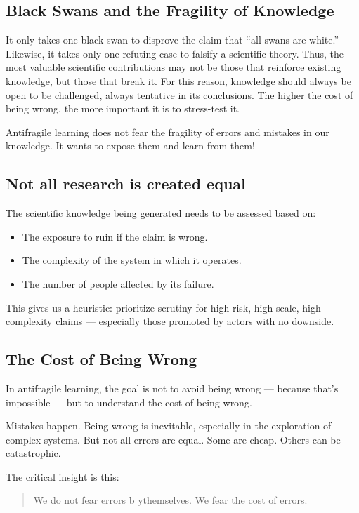 \subsection{Black Swans and the Fragility of Knowledge}

It only takes one black swan to disprove the claim that “all swans are white.” Likewise, it takes only one refuting case to falsify a scientific theory. Thus, the most valuable scientific contributions may not be those that reinforce existing knowledge, but those that break it. For this reason, knowledge should always be open to be challenged, always tentative in its conclusions. The higher the cost of being wrong, the more important it is to stress-test it.

Antifragile learning does not fear the fragility of errors and mistakes in our knowledge. It wants to expose them and learn from them!

\subsection{Not all research is created equal}

The scientific knowledge being generated needs to be assessed based on:
\begin{itemize}
	\item The exposure to ruin if the claim is wrong.
	\item The complexity of the system in which it operates.
	\item The number of people affected by its failure.
\end{itemize}

This gives us a heuristic: prioritize scrutiny for high-risk, high-scale, high-complexity claims — especially those promoted by actors with no downside.

\subsection{The Cost of Being Wrong}

In antifragile learning, the goal is not to avoid being wrong — because that’s impossible — but to understand the cost of being wrong.

Mistakes happen. Being wrong is inevitable, especially in the exploration of complex systems. But not all errors are equal. Some are cheap. Others can be catastrophic. 

The critical insight is this:
\begin{quote}
	We do not fear errors b ythemselves. We fear the cost of errors.
\end{quote}

